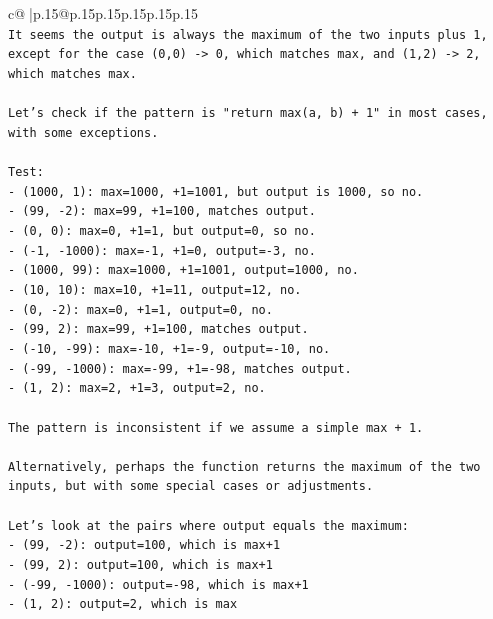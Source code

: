 \documentclass{article}
\begin{document}
{\begin{supertabular}{c@{$\;$}|p{.15\linewidth}@{}p{.15\linewidth}p{.15\linewidth}p{.15\linewidth}p{.15\linewidth}p{.15\linewidth}}
{{{\\ 
\texttt{It seems the output is always the maximum of the two inputs plus 1, except for the case (0,0) {-}> 0, which matches max, and (1,2) {-}> 2, which matches max.} \\
\\ 
\texttt{Let's check if the pattern is "return max(a, b) + 1" in most cases, with some exceptions.} \\
\\ 
\texttt{Test:} \\
\texttt{{-} (1000, 1): max=1000, +1=1001, but output is 1000, so no.} \\
\texttt{{-} (99, {-}2): max=99, +1=100, matches output.} \\
\texttt{{-} (0, 0): max=0, +1=1, but output=0, so no.} \\
\texttt{{-} ({-}1, {-}1000): max={-}1, +1=0, output={-}3, no.} \\
\texttt{{-} (1000, 99): max=1000, +1=1001, output=1000, no.} \\
\texttt{{-} (10, 10): max=10, +1=11, output=12, no.} \\
\texttt{{-} (0, {-}2): max=0, +1=1, output=0, no.} \\
\texttt{{-} (99, 2): max=99, +1=100, matches output.} \\
\texttt{{-} ({-}10, {-}99): max={-}10, +1={-}9, output={-}10, no.} \\
\texttt{{-} ({-}99, {-}1000): max={-}99, +1={-}98, matches output.} \\
\texttt{{-} (1, 2): max=2, +1=3, output=2, no.} \\
\\ 
\texttt{The pattern is inconsistent if we assume a simple max + 1.} \\
\\ 
\texttt{Alternatively, perhaps the function returns the maximum of the two inputs, but with some special cases or adjustments.} \\
\\ 
\texttt{Let's look at the pairs where output equals the maximum:} \\
\texttt{{-} (99, {-}2): output=100, which is max+1} \\
\texttt{{-} (99, 2): output=100, which is max+1} \\
\texttt{{-} ({-}99, {-}1000): output={-}98, which is max+1} \\
\texttt{{-} (1, 2): output=2, which is max} \\
\\ 
}}}
\end{supertabular}}
\end{document}
